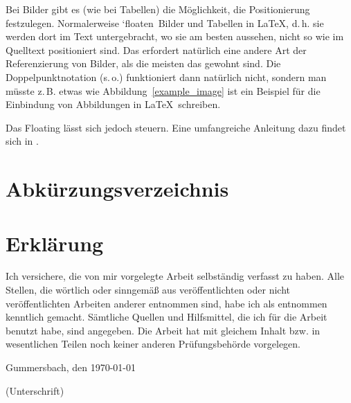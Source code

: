 \documentclass[12pt,oneside,a4paper,bibtotoc,liststotoc]{scrreprt}
\newcommand{\zB}{\mbox{z.\,B.}\xspace}
\newcommand{\dH}{\mbox{d.\,h.}\xspace}
\newcommand{\so}{\mbox{s.\,o.}\xspace}
\begin{document}
Bei Bilder gibt es (wie bei Tabellen) die Möglichkeit, die
Positionierung festzulegen. Normalerweise `\glqq floaten\grqq\ Bilder
und Tabellen in \LaTeX, \dH sie werden dort im Text untergebracht, wo
sie am besten aussehen, nicht so wie im Quelltext positioniert
sind. Das erfordert natürlich eine andere Art der Referenzierung von
Bilder, als die meisten das gewohnt sind. Die Doppelpunktnotation
(\so) funktioniert dann natürlich nicht, sondern man müsste \zB etwas
wie \glqq Abbildung~\ref{example_image} ist ein Beispiel für die
Einbindung von Abbildungen in \LaTeX \grqq\ schreiben.

Das Floating lässt sich jedoch steuern. Eine umfangreiche Anleitung
dazu findet sich in \cite[][]{WikibookFloats}.

\chapter*{Abkürzungsverzeichnis}
\begin{acronym}[Acronms]

\end{acronym}

{}

\listoffigures

\listoftables

\lstlistoflistings


\appendix

\chapter{Erklärung}

Ich versichere, die von mir vorgelegte Arbeit selbständig verfasst zu
haben. Alle Stellen, die wörtlich oder sinngemäß aus veröffentlichten
oder nicht veröffentlichten Arbeiten anderer entnommen sind, habe ich
als entnommen kenntlich gemacht. Sämtliche Quellen und Hilfsmittel,
die ich für die Arbeit benutzt habe, sind angegeben. Die Arbeit hat
mit gleichem Inhalt bzw. in wesentlichen Teilen noch keiner anderen
Prüfungsbehörde vorgelegen.

\bigskip

Gummersbach, den \today

\bigskip

\bigskip

\bigskip

\bigskip

\bigskip

\bigskip

(Unterschrift)
\end{document}
